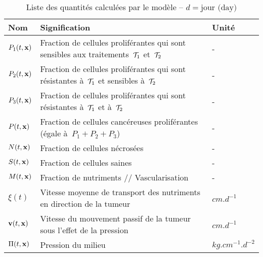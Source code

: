 \documentclass[main.tex]{subfiles}
\begin{document}
 \begin{table}[h]
 \centering
 {\footnotesize%
 \begin{tabularx}{\textwidth}{|l|X|l|}
 \hline
 \rowcolor[gray]{0.7} 
 Nom & Signification  & Unité \\
 \hline
 $P_1(t,\mathbf{x})$ & Fraction de cellules proliférantes qui sont sensibles 
 aux traitements~${\mathcal T_1}$ et~${\mathcal T_2}$ & -  \\
 \hline
 $P_2(t,\mathbf{x})$ & Fraction de cellules proliférantes qui sont résistantes à~${\mathcal T_1}$ et sensibles à~${\mathcal T_2}$  & -  \\
 \hline
 $P_3(t,\mathbf{x})$ & Fraction de cellules proliférantes qui sont résistantes à~${\mathcal T_1}$ et à~${\mathcal T_2}$  & -  \\
 \hline
 $P(t,\mathbf{x})$ & Fraction de cellules cancéreuses proliférantes (égale à~$P_1+P_2+P_3$) & -  \\
 \hline
 $N(t,\mathbf{x})$ & Fraction de cellules nécrosées & - \\
 \hline
 $S(t,\mathbf{x})$ & Fraction de cellules saines & - \\
 \hline
 $M(t,\mathbf{x})$ & Fraction de nutriments // Vascularisation & - \\
 \hline
 $\xi(t)$ &Vitesse moyenne de transport des nutriments en direction de la tumeur & $cm.d^{-1}$ \\
 \hline
 $\mathbf{v}(t,\mathbf{x})$ &Vitesse du mouvement passif de la tumeur sous l'effet de la pression& $cm.d^{-1}$ \\
 \hline
 $\Pi(t,\mathbf{x})$ & Pression du milieu\protect\footnotemark
 & $kg.cm^{-1}.d^{-2}$\\
 \hline
 \end{tabularx}
 }
 \caption{\label{table_variable}Liste des quantités calculées par le modèle
 -- $d=\textrm{jour (day)}$ } 
 \end{table}
\end{document}
